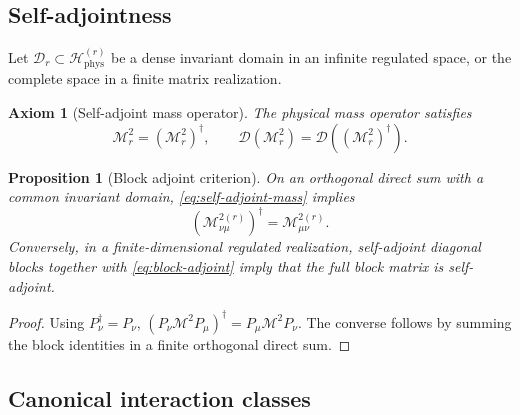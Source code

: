 \documentclass[11pt]{article}
\newtheorem{axiom}[definition]{Axiom}
\newtheorem{proposition}[definition]{Proposition}
\newcommand{\Phys}{\mathcal H_{\mathrm{phys}}}
\newcommand{\cM}{\mathcal M}
\newcommand{\cD}{\mathcal D}
\begin{document}
\subsection{Self-adjointness}

Let \(\cD_r\subset\Phys^{(r)}\) be a dense invariant domain in an infinite
regulated space, or the complete space in a finite matrix realization.

\begin{axiom}[Self-adjoint mass operator]
\label{ax:self-adjoint-mass}
The physical mass operator satisfies
\begin{equation}
 \cM_r^2=(\cM_r^2)^\dagger,
 \qquad
 \cD(\cM_r^2)=\cD((\cM_r^2)^\dagger).
\label{eq:self-adjoint-mass}
\end{equation}
\end{axiom}

\begin{proposition}[Block adjoint criterion]
\label{prop:block-adjoint}
On an orthogonal direct sum with a common invariant domain,
\cref{eq:self-adjoint-mass} implies
\begin{equation}
 (\cM_{\nu\mu}^{2(r)})^\dagger
 =\cM_{\mu\nu}^{2(r)}.
\label{eq:block-adjoint}
\end{equation}
Conversely, in a finite-dimensional regulated realization, self-adjoint
diagonal blocks together with \cref{eq:block-adjoint} imply that the full
block matrix is self-adjoint.
\end{proposition}

\begin{proof}
Using \(P_\nu^\dagger=P_\nu\),
\((P_\nu\cM^2P_\mu)^\dagger=P_\mu\cM^2P_\nu\).  The converse follows by
summing the block identities in a finite orthogonal direct sum.
\end{proof}

\subsection{Canonical interaction classes}
\end{document}
